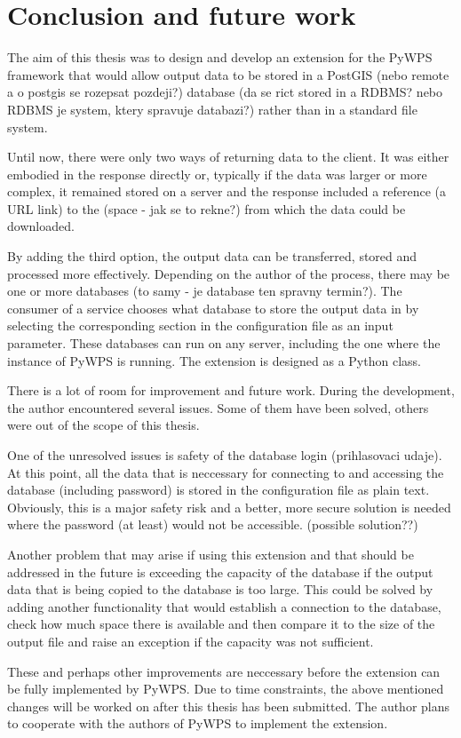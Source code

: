 \chapter{Conclusion and future work}
\label{5-conclusion}


The aim of this thesis was to design and develop an extension for the PyWPS framework that would allow output data to be stored in a PostGIS (nebo remote a o postgis se rozepsat pozdeji?) database (da se rict stored in a RDBMS? nebo RDBMS je system, ktery spravuje databazi?) rather than in a standard file system. 

Until now, there were only two ways of returning data to the client. It was either embodied in the response directly or, typically if the data was larger or more complex, it remained stored on a server and the response included a reference (a URL link) to the (space  - jak se to rekne?) from which the data could be downloaded.

By adding the third option, the output data can be transferred, stored and processed more effectively. Depending on the author of the process, there may be one or more databases (to samy - je database ten spravny termin?). The consumer of a service chooses what database to store the output data in by selecting the corresponding section in the configuration file as an input parameter. These databases can run on any server, including the one where the instance of PyWPS is running. The extension is designed as a Python class. 

There is a lot of room for improvement and future work. During the development, the author encountered several issues. Some of them have been solved, others were out of the scope of this thesis. 

One of the unresolved issues is safety of the database login (prihlasovaci udaje). At this point, all the data that is neccessary for connecting to and accessing the database (including password) is stored in the configuration file as plain text. Obviously, this is a major safety risk and a better, more secure solution is needed where the password (at least) would not be accessible. (possible solution??)

Another problem that may arise if using this extension and that should be addressed in the future is exceeding the capacity of the database if the output data that is being copied to the database is too large. This could be solved by adding another functionality that would establish a connection to the database, check how much space there is available and then compare it to the size of the output file and raise an exception if the capacity was not sufficient.

These and perhaps other improvements are neccessary before the extension can be fully implemented by PyWPS. Due to time constraints, the above mentioned changes will be worked on after this thesis has been submitted. The author plans to cooperate with the authors of PyWPS to implement the extension.




